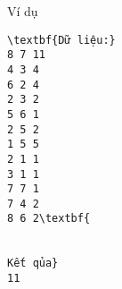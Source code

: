 Ví dụ
\begin{verbatim}
\textbf{Dữ liệu:} 
8 7 11
4 3 4
6 2 4
2 3 2
5 6 1
2 5 2
1 5 5
2 1 1
3 1 1
7 7 1
7 4 2
8 6 2\textbf{


Kết qủa} 
11
\end{verbatim}